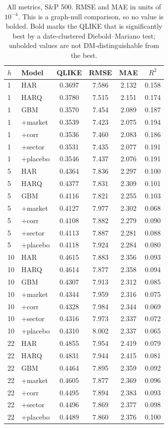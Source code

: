 \documentclass{llncs}
\begin{document}
\begin{table}[t]
\centering
\caption{All metrics, S\&P 500. RMSE and MAE in units of $10^{-4}$. This is a graph-null comparison, so no value is
bolded. Bold marks the QLIKE that is significantly best by a date-clustered Diebold--Mariano test; unbolded values
are not DM-distinguishable from the best.}
\label{tab:sp-allmetrics}
\footnotesize
\setlength{\tabcolsep}{6pt}
\begin{tabular}{llcccc}
\toprule
$h$ & Model & QLIKE & RMSE & MAE & $R^2$ \\
\midrule
1  & HAR      & 0.3697 & 7.586 & 2.132 & 0.158 \\
1  & HARQ     & 0.3780 & 7.515 & 2.151 & 0.174 \\
1  & GBM      & 0.3570 & 7.454 & 2.089 & 0.187 \\
1  & +market  & 0.3539 & 7.423 & 2.075 & 0.194 \\
1  & +corr    & 0.3536 & 7.460 & 2.083 & 0.186 \\
1  & +sector  & 0.3531 & 7.435 & 2.077 & 0.191 \\
1  & +placebo & 0.3546 & 7.437 & 2.076 & 0.191 \\
\midrule
5  & HAR      & 0.4364 & 7.836 & 2.297 & 0.100 \\
5  & HARQ     & 0.4377 & 7.831 & 2.309 & 0.101 \\
5  & GBM      & 0.4116 & 7.821 & 2.255 & 0.103 \\
5  & +market  & 0.4127 & 7.977 & 2.302 & 0.068 \\
5  & +corr    & 0.4108 & 7.882 & 2.279 & 0.090 \\
5  & +sector  & 0.4113 & 7.887 & 2.281 & 0.088 \\
5  & +placebo & 0.4118 & 7.924 & 2.284 & 0.080 \\
\midrule
10 & HAR      & 0.4615 & 7.883 & 2.356 & 0.093 \\
10 & HARQ     & 0.4614 & 7.877 & 2.358 & 0.094 \\
10 & GBM      & 0.4307 & 7.913 & 2.312 & 0.085 \\
10 & +market  & 0.4344 & 7.959 & 2.316 & 0.075 \\
10 & +corr    & 0.4328 & 7.984 & 2.344 & 0.069 \\
10 & +sector  & 0.4316 & 7.973 & 2.337 & 0.072 \\
10 & +placebo & 0.4310 & 8.002 & 2.337 & 0.065 \\
\midrule
22 & HAR      & 0.4855 & 7.954 & 2.419 & 0.079 \\
22 & HARQ     & 0.4831 & 7.944 & 2.415 & 0.081 \\
22 & GBM      & 0.4464 & 7.895 & 2.359 & 0.092 \\
22 & +market  & 0.4605 & 7.877 & 2.369 & 0.096 \\
22 & +corr    & 0.4495 & 7.894 & 2.383 & 0.093 \\
22 & +sector  & 0.4496 & 7.869 & 2.377 & 0.098 \\
22 & +placebo & 0.4489 & 7.860 & 2.376 & 0.100 \\
\bottomrule
\end{tabular}
\end{table}
\end{document}
